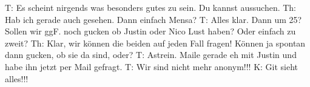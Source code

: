 T: Es scheint nirgends was besonders gutes zu sein. Du kannst aussuchen.
Th: Hab ich gerade auch gesehen. Dann einfach Mensa? 
T: Alles klar. Dann um 25? Sollen wir ggF. noch gucken ob Justin oder Nico Lust haben? Oder einfach zu zweit?
Th: Klar, wir können die beiden auf jeden Fall fragen! Können ja spontan dann gucken, ob sie da sind, oder? 
T: Astrein. Maile gerade eh mit Justin und habe ihn jetzt per Mail gefragt. 
T: Wir sind nicht mehr anonym!!!
K: Git sieht alles!!!
